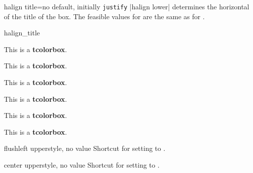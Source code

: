 \clearpage
\begin{docTcbKey}[][doc new=2015-05-07]{halign title}{=}{no default, initially \texttt{justify}}
  |halign lower| determines the horizontal  of the title of the box.
  The feasible values for  are the same as for .

\begin{exdispExample}{halign_title}
\begin{tcbraster}[raster columns=3,fonttitle=\bfseries,
  colback=red!5!white,colframe=red!75!black]

  \begin{tcolorbox}[adjusted title=flush center,halign title=flush center]
    This is a \textbf{tcolorbox}.
  \end{tcolorbox}
  \begin{tcolorbox}[adjusted title=flush left,halign title=flush left]
    This is a \textbf{tcolorbox}.
  \end{tcolorbox}
  \begin{tcolorbox}[adjusted title=flush right,halign title=flush right]
    This is a \textbf{tcolorbox}.
  \end{tcolorbox}
  \begin{tcolorbox}[adjusted title=center,halign title=center]
    This is a \textbf{tcolorbox}.
  \end{tcolorbox}
  \begin{tcolorbox}[adjusted title=left,halign title=left]
    This is a \textbf{tcolorbox}.
  \end{tcolorbox}
  \begin{tcolorbox}[adjusted title=right,halign title=right]
    This is a \textbf{tcolorbox}.
  \end{tcolorbox}

\end{tcbraster}
\end{exdispExample}
\end{docTcbKey}

\enlargethispage*{1cm}

\begin{docTcbKey}[][doc updated=2015-05-07]{flushleft upper}{}{style, no value}
  Shortcut for setting  to .
\end{docTcbKey}

\begin{docTcbKey}[][doc updated=2015-05-07]{center upper}{}{style, no value}
  Shortcut for setting  to .
\end{docTcbKey}

